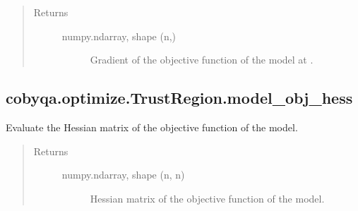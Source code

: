 \documentclass[letterpaper,10pt,english]{sphinxmanual}
\begin{document}
\begin{fulllineitems}
\begin{fulllineitems}
\begin{quote}
\begin{description}
\begin{description}
\end{description}

\item[{Returns}] \leavevmode\begin{description}
\item[{numpy.ndarray, shape (n,)}] \leavevmode
\sphinxAtStartPar
Gradient of the objective function of the model at .

\end{description}

\end{description}\end{quote}

\end{fulllineitems}



\subsection{cobyqa.optimize.TrustRegion.model\_obj\_hess}
\label{\detokenize{refs/generated/cobyqa.optimize.TrustRegion.model_obj_hess:cobyqa-optimize-trustregion-model-obj-hess}}\label{\detokenize{refs/generated/cobyqa.optimize.TrustRegion.model_obj_hess::doc}}

\begin{fulllineitems}
\label{\detokenize{refs/generated/cobyqa.optimize.TrustRegion.model_obj_hess:cobyqa.optimize.TrustRegion.model_obj_hess}}
\sphinxAtStartPar
Evaluate the Hessian matrix of the objective function of the model.
\begin{quote}\begin{description}
\item[{Returns}] \leavevmode\begin{description}
\item[{numpy.ndarray, shape (n, n)}] \leavevmode
\sphinxAtStartPar
Hessian matrix of the objective function of the model.

\end{description}

\end{description}\end{quote}

\end{fulllineitems}




\end{fulllineitems}
\end{document}
